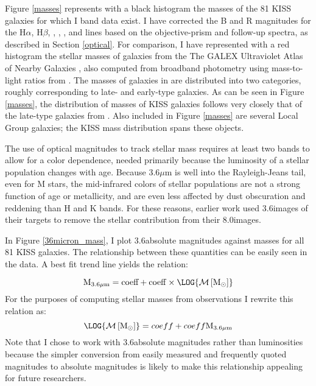 Figure \ref{masses} represents with a black histogram the masses of the 81 KISS galaxies for which I band data exist. I have corrected the B and R magnitudes for the H$\alpha$, H$\beta$, , , , and  lines based on the objective-prism and follow-up spectra, as described in Section \ref{optical}.  For comparison, I have represented with a red histogram the stellar masses of galaxies from the The GALEX Ultraviolet Atlas of Nearby Galaxies \citep{GildePaz}, also computed from broadband photometry using mass-to-light ratios from \cite{Bell}. The masses of galaxies in \cite{GildePaz} are distributed into two categories, roughly corresponding to late- and early-type galaxies.  As can be seen in Figure \ref{masses}, the distribution of masses of KISS galaxies follows very closely that of the late-type galaxies from \cite{GildePaz}.  Also included in Figure \ref{masses} are several Local Group galaxies; the KISS mass distribution spans these objects.


The use of optical magnitudes to track stellar mass requires at least two bands to allow for a color dependence, needed primarily because the luminosity of a stellar population changes with age. Because 3.6$\mu$m is well into the Rayleigh-Jeans tail, even for  M stars, the mid-infrared colors of stellar populations are not a strong function of age or metallicity, and are even less affected by dust obscuration and reddening than H and K bands. For these reasons, earlier work \citep{Rosenberg,Calzetti2007,Wu} used 3.6\micron images of their targets to remove the stellar contribution from their 8.0\micron images. 

In Figure \ref{36micron_mass}, I plot 3.6\micron absolute magnitudes against masses for all 81 KISS galaxies. The relationship between these quantities can be easily seen in the data. A best fit trend line yields the relation:

\begin{equation}
\rm{M}_{3.6\mu m} = \fit{36micron_mass}{ada} + \fit{36micron_mass}{bdb}\times \LOG{\rm{{\cal M}\left[M_\odot\right]}}
\end{equation}
For the purposes of computing stellar masses from observations I rewrite this relation as:
\begin{equation}
\LOG{\rm{{\cal M}\left[M_\odot\right]}} = \fit{mass_36micron}{ada} + \fit{mass_36micron}{bdb} \rm{M}_{3.6\mu m}
\end{equation}
Note that I chose to work with 3.6\micron absolute magnitudes rather than luminosities because the simpler conversion from easily measured and frequently quoted magnitudes to absolute magnitudes is likely to make this relationship appealing for future researchers.

